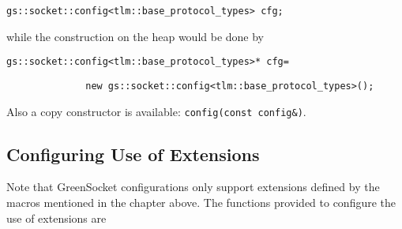 \documentclass[a4paper,10pt]{article}          %
\begin{document}
\verb|gs::socket::config<tlm::base_protocol_types> cfg;|

\noindent while the construction on the heap would be done by

\verb|gs::socket::config<tlm::base_protocol_types>* cfg=|

\verb|              new gs::socket::config<tlm::base_protocol_types>();|

\noindent Also a copy constructor is available: \verb|config(const config&)|.

\subsection{Configuring Use of Extensions}

Note that GreenSocket configurations only support extensions defined by the macros mentioned in the chapter above.
The functions provided to configure the use of extensions are
\end{document}
